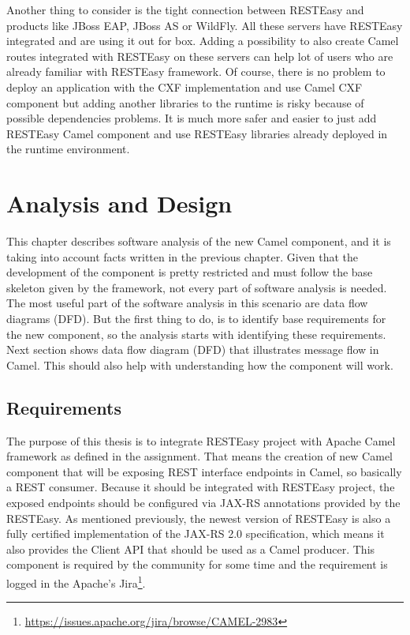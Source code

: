 \documentclass[12pt,final,oneside]{fithesis2}
\begin{document}
Another thing to consider is the tight connection between RESTEasy and products like JBoss EAP, JBoss AS or WildFly. All these servers have RESTEasy integrated and are using it out for box. Adding a possibility to also create Camel routes integrated with RESTEasy on these servers can help lot of users who are already familiar with RESTEasy framework. Of course, there is no problem to deploy an application with the CXF implementation and use Camel CXF component but adding another libraries to the runtime is risky because of possible dependencies problems. It is much more safer and easier to just add RESTEasy Camel component and use RESTEasy libraries already deployed in the runtime environment.

%
\chapter{Analysis and Design}
This chapter describes software analysis of the new Camel component, and it is taking into account facts written in the previous chapter. Given that the development of the component is pretty restricted and must follow the base skeleton given by the framework, not every part of software analysis is needed. The most useful part of the software analysis in this scenario are data flow diagrams (DFD). But the first thing to do, is to identify base requirements for the new component, so the analysis starts with identifying these requirements. Next section shows data flow diagram (DFD) that illustrates message flow in Camel. This should also help with understanding how the component will work. 

\section{Requirements}
The purpose of this thesis is to integrate RESTEasy project with Apache Camel framework as defined in the assignment. That means the creation of new Camel component that will be exposing REST interface endpoints in Camel, so basically a REST consumer. Because it should be integrated with RESTEasy project, the exposed endpoints should be configured via JAX-RS annotations provided by the RESTEasy. As mentioned previously, the newest version of RESTEasy is also a fully certified implementation of the JAX-RS 2.0 specification, which means it also provides the Client API that should be used as a Camel producer. This component is required by the community for some time and the requirement is logged in  
the Apache's Jira\footnote{\url{https://issues.apache.org/jira/browse/CAMEL-2983}}.
\end{document}
